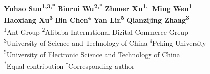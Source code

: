 \textbf{Yuhao Sun\textsuperscript{1,3,*}}
\quad
\textbf{Binrui Wu\textsuperscript{2,*}}
\quad
\textbf{Zhuoer Xu\textsuperscript{1,\ensuremath{\dagger}}}
\quad
\textbf{Ming Wen\textsuperscript{1}}
\\
\textbf{Haoxiang Xu\textsuperscript{3}}
\quad
\textbf{Bin Chen\textsuperscript{4}}
\quad
\textbf{Yan Lin\textsuperscript{5}}
\quad
\textbf{Qianzijing Zhang\textsuperscript{3}}
\\[2mm]
\textsuperscript{1}Ant Group
\quad
\textsuperscript{2}Alibaba International Digital Commerce Group
\\
\textsuperscript{3}University of Science and Technology of China
\quad
\textsuperscript{4}Peking University
\\
\textsuperscript{5}University of Electronic Science and Technology of China
\\[1mm]
\textsuperscript{*}Equal contribution
\qquad
\textsuperscript{\ensuremath{\dagger}}Corresponding author
